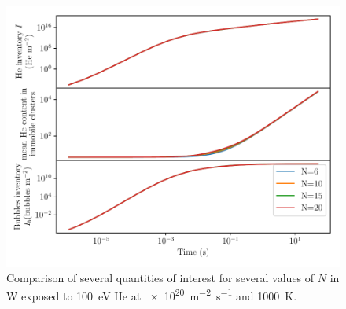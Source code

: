 \begin{figure} [h]
    \centering
    \includegraphics[width=\linewidth]{Figures/Chapter4/varying_N.pdf}
    \caption{Comparison of several quantities of interest for several values of $N$ in W exposed to \SI{100}{eV} He at \SI{e20}{m^{-2}.s^{-1}} and \SI{1000}{K}.}
\end{figure}
